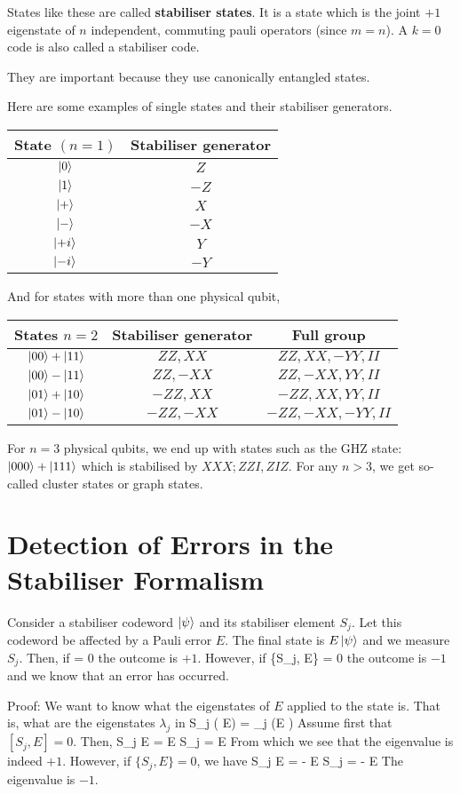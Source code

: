 States like these are called \textbf{stabiliser states}. It is a state which is the joint $+1$ eigenstate of $n$ independent, commuting pauli operators (since $m = n$). A $k = 0$ code is also called a stabiliser code. 

They are important because they use canonically entangled states. 

Here are some examples of single states and their stabiliser generators. 

\begin{tabular}{cc}
State $(n = 1)$& Stabiliser generator \\ \hline
$\ket{0}$ & $Z$ \\
$\ket{1}$ & $-Z$ \\
$\ket{+}$ & $X$ \\
$\ket{-}$ & $-X$ \\
$\ket{+i}$ & $Y$ \\
$\ket{-i}$ & $-Y$
\end{tabular}

And for states with more than one physical qubit,
 
\begin{tabular}{ccc}
States $n = 2$ & Stabiliser generator  & Full group\\ \hline
$\ket{00} + \ket{11}$ & $ZZ, XX$  & $ZZ, XX, -YY, II$\\
$\ket{00} - \ket{11}$ & $ZZ, -XX$  & $ZZ, -XX, YY, II$\\
$\ket{01} + \ket{10}$ & $-ZZ, XX$ & $-ZZ, XX, YY, II$\\
$\ket{01} - \ket{10}$ & $- ZZ, -XX$ & $-ZZ, -XX, -YY, II$
\end{tabular}

For $n = 3$ physical qubits, we end up with states such as the GHZ state: $\ket{000} + \ket{111}$ which is stabilised by $XXX; ZZI, ZIZ$. For any $n >3$, we get so-called cluster states or graph states. 

\section{Detection of Errors in the Stabiliser Formalism}
Consider a stabiliser codeword $\ket{\psi}$ and its stabiliser element $S_j$. Let this codeword be affected by a Pauli error $E$. The final state is $E\ket{\psi}$ and we measure $S_j$. Then, if
\beq
[S_j, E] = 0
\eeq
the outcome is $+1$. However, if 
\beq
\{S_j, E\} = 0
\eeq
the outcome is $-1$ and we know that an error has occurred. 

Proof: We want to know what the eigenstates of $E$ applied to the state is. That is, what are the eigenstates $\lambda_j$ in 
\beq
S_j \left( E\ket{\psi}\right) = \lambda_j \left(E \ket{\psi}\right)
\eeq
Assume first that $[S_j, E] = 0$. Then, 
\beq
S_j E \ket{\psi} = E S_j \ket{\psi} = E\ket{\psi}
\eeq
From which we see that the eigenvalue is indeed $+1$. However, if $\{S_j, E\} = 0$, we have
\beq
S_j E \ket{\psi} = - E S_j \ket{\psi} = - E \ket{\psi}
\eeq
The eigenvalue is $-1$. 


